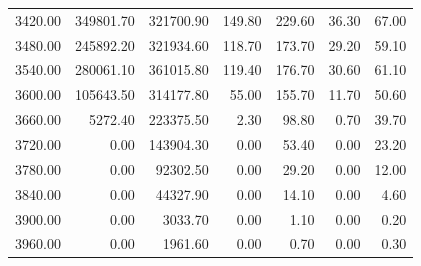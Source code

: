 \begin{tabular}{r|rr|rr|rr|}
3420.00 & 349801.70 & 321700.90 & 149.80 & 229.60 & 36.30 & 67.00 \\
3480.00 & 245892.20 & 321934.60 & 118.70 & 173.70 & 29.20 & 59.10 \\
3540.00 & 280061.10 & 361015.80 & 119.40 & 176.70 & 30.60 & 61.10 \\
3600.00 & 105643.50 & 314177.80 & 55.00 & 155.70 & 11.70 & 50.60 \\
3660.00 & 5272.40 & 223375.50 & 2.30 & 98.80 & 0.70 & 39.70 \\
3720.00 & 0.00 & 143904.30 & 0.00 & 53.40 & 0.00 & 23.20 \\
3780.00 & 0.00 & 92302.50 & 0.00 & 29.20 & 0.00 & 12.00 \\
3840.00 & 0.00 & 44327.90 & 0.00 & 14.10 & 0.00 & 4.60 \\
3900.00 & 0.00 & 3033.70 & 0.00 & 1.10 & 0.00 & 0.20 \\
3960.00 & 0.00 & 1961.60 & 0.00 & 0.70 & 0.00 & 0.30 \\
\bottomrule
\end{tabular}
